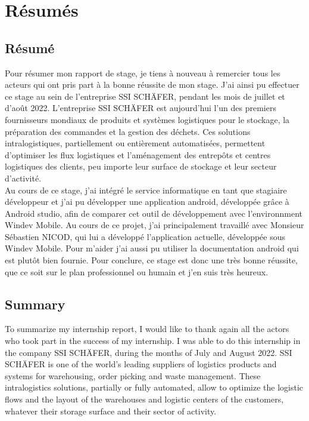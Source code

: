 \documentclass[a4paper, 12pt, french]{article}
\begin{document}
		\newpage

	\section*{Résumés}
		\subsection*{Résumé}
	Pour résumer mon rapport de stage, je tiens à nouveau à remercier tous les acteurs qui ont pris part à la bonne réussite de mon stage. J'ai ainsi pu effectuer ce stage au sein de l'entreprise SSI SCHÄFER, pendant les mois de juillet et d'août 2022. L'entreprise SSI SCHÄFER est aujourd'hui l'un des premiers fournisseurs mondiaux de produits et systèmes logistiques pour le stockage, la préparation des commandes et la gestion des déchets. Ces solutions intralogistiques, partiellement ou entièrement automatisées, permettent d’optimiser les flux logistiques et l’aménagement des entrepôts et centres logistiques des clients, peu importe leur surface de stockage et leur secteur d’activité.\\

	Au cours de ce stage, j'ai intégré le service informatique en tant que stagiaire développeur et j'ai pu développer une application android, développée grâce à Android studio, afin de comparer cet outil de développement avec l'environnment Windev Mobile. Au cours de ce projet, j'ai principalement travaillé avec Monsieur Sébastien NICOD, qui lui a développé l'application actuelle, développée sous Windev Mobile. Pour m'aider j'ai aussi pu utiliser la documentation android qui est plutôt bien fournie. Pour conclure, ce stage est donc une très bonne réussite, que ce soit sur le plan professionnel ou humain et j'en suis très heureux.

		\subsection*{Summary}
	To summarize my internship report, I would like to thank again all the actors who took part in the success of my internship. I was able to do this internship in the company SSI SCHÄFER, during the months of July and August 2022. SSI SCHÄFER is one of the world's leading suppliers of logistics products and systems for warehousing, order picking and waste management. These intralogistics solutions, partially or fully automated, allow to optimize the logistic flows and the layout of the warehouses and logistic centers of the customers, whatever their storage surface and their sector of activity.\\
\end{document}

